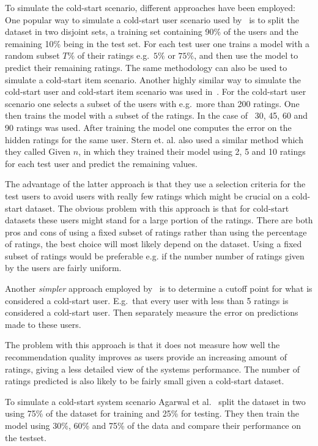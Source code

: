 To simulate the cold-start scenario, different approaches have been employed:
One popular way to simulate a cold-start user scenario used by~\cite{Stern2009,
Lam2008} is to split the dataset in two disjoint sets, a training set
containing 90\% of the users and the remaining 10\% being in the test set. For
each test user one trains a model with a random subset $T\%$ of their ratings
e.g.\ $5\%$ or $75\%$, and then use the model to predict their remaining
ratings. The same methodology can also be used to simulate a cold-start item
scenario. Another highly similar way to simulate the cold-start user and
cold-start item scenario was used in~\cite{Rashid2002, Rashid2008}. For the
cold-start user scenario one selects a subset of the users with e.g.\ more than
200 ratings. One then trains the model with a subset of the ratings. In the
case of~\cite{Rashid2002} 30, 45, 60 and 90 ratings was used. After training
the model one computes the error on the hidden ratings for the same user.
Stern et. al. \cite{Stern1998} also used a similar method which they called Given $n$, in which
they trained their model using 2, 5 and 10 ratings for each test user and predict
the remaining values.

The advantage of the latter approach is that they use a selection criteria for the test users
to avoid users with really few ratings which might be crucial on a cold-start dataset.
The obvious problem with this approach is that for cold-start datasets these users might stand for a large portion of the ratings. There are both pros and cons of using a fixed subset of ratings rather than using the percentage of ratings, the best choice will most likely depend on the dataset. Using a fixed subset of ratings would be preferable e.g. if the number number of ratings given by the users are fairly uniform.

Another \emph{simpler} approach employed by~\cite{Massa2007, Jamali2009} is to
determine a cutoff point for what is considered a cold-start user. E.g.\ that
every user with less than 5 ratings is considered a cold-start user. Then
separately measure the error on predictions made to these users.

The problem with this approach is that it does not measure how well the recommendation quality improves as
users provide an increasing amount of ratings, giving a less detailed view of the systems performance.
The number of ratings predicted is also likely to be fairly small given a cold-start dataset.

To simulate a cold-start system scenario Agarwal et al.~\cite{Agarwal2009}
split the dataset in two using 75\% of the dataset for training and 25\% for
testing. They then train the model using 30\%, 60\% and 75\% of the data and
compare their performance on the testset.


